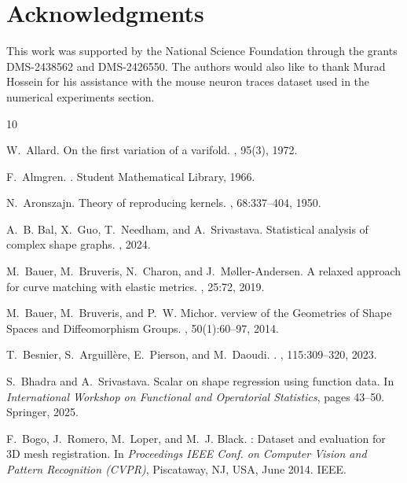 \documentclass[11pt]{article}
\begin{document}
\section*{Acknowledgments}
This work was supported by the National Science Foundation through the grants DMS-2438562 and DMS-2426550. The authors would also like to thank Murad Hossein for his assistance with the mouse neuron traces dataset used in the numerical experiments section.  


\begin{thebibliography}{10}

W.~Allard.
\newblock On the first variation of a varifold.
, 95(3), 1972.

F.~Almgren.
.
\newblock Student Mathematical Library, 1966.

N.~Aronszajn.
\newblock Theory of reproducing kernels.
, 68:337--404, 1950.

A.~B. Bal, X.~Guo, T.~Needham, and A.~Srivastava.
\newblock Statistical analysis of complex shape graphs.
, 2024.

M.~Bauer, M.~Bruveris, N.~Charon, and J.~M{\o}ller-Andersen.
\newblock A relaxed approach for curve matching with elastic metrics.
, 25:72, 2019.

M.~Bauer, M.~Bruveris, and P.~W. Michor.
verview of the {G}eometries of {S}hape {S}paces and {D}iffeomorphism {G}roups.
, 50(1):60–97, 2014.

T.~Besnier, S.~Arguill{\`e}re, E.~Pierson, and M.~Daoudi.
.
, 115:309--320, 2023.

S.~Bhadra and A.~Srivastava.
\newblock Scalar on shape regression using function data.
\newblock In {\em International Workshop on Functional and Operatorial Statistics}, pages 43--50. Springer, 2025.

F.~Bogo, J.~Romero, M.~Loper, and M.~J. Black.
: Dataset and evaluation for {3D} mesh registration.
\newblock In {\em Proceedings IEEE Conf. on Computer Vision and Pattern Recognition (CVPR)}, Piscataway, NJ, USA, June 2014. IEEE.


\end{thebibliography}
\end{document}
